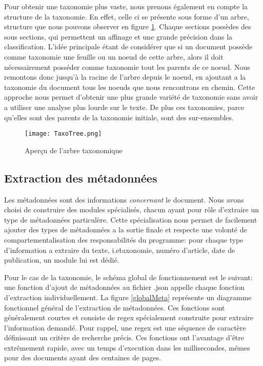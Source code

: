 Pour obtenir une taxonomie plus vaste, nous prenons également en compte la structure de la taxonomie.
En effet, celle ci se présente sous forme d'un arbre, structure que nous pouvons observer en figure \ref{fig:tree}.
Chaque sections possèdes des sous sections, qui permettent un affinage et une grande précision dans la classification.
L'idée principale étant de considérer que si un document possède comme taxonomie une feuille ou un noeud de cette arbre, alors il doit nécessairement posséder comme taxonomie tout les parents de ce noeud.
Nous remontons donc jusqu'à la racine de l'arbre depuis le noeud, en ajoutant a la taxonomie du document tous les noeuds que nous rencontrons en chemin.
Cette approche nous permet d'obtenir une plus grande variété de taxonomie sans avoir a utiliser une analyse plus lourde sur le texte.
De plus ces taxonomies, parce qu'elles sont des parents de la taxonomie initiale, sont des sur-ensembles.
\begin{figure}[h!]
  \centering
  \texttt{[image: TaxoTree.png]}
	\caption[]{Aperçu de l'arbre taxonomique}
  \label{fig:tree}
\end{figure}

\subsection{Extraction des métadonnées}
Les métadonnées sont des informations \textit{concernant} le document.
Nous avons choisi de construire des modules spécialisés, chacun ayant pour rôle d'extraire un type de métadonnées particulère.
Cette spécialisation nous permet de facilement ajouter des types de métadonnées a la sortie finale et respecte une volonté de compartementalisation des responsabilités du programme: pour chaque type d'information a extraire du texte, i.e\. taxonomie, numéro d'article, date de publication, un module lui est dédié. 

Pour le cas de la taxonomie, le schéma global de fonctionnement est le suivant: une fonction d'ajout de métadonnées au fichier .json appelle chaque fonction d'extraction individuellement.
La figure \ref{globalMeta} représente un diagramme fonctionnel général de l'extraction de métadonnées. 
Ces fonctions sont généralement courtes et consiste de regex spécialement construite pour extraire l'information demandé.
Pour rappel, une regex est une séquence de caractère définissant un critère de recherche précis.
Ces fonctions ont l'avantage d'être extrêmement rapide, avec un temps d'execution dans les millisecondes, mêmes pour des documents ayant des centaines de pages. 

